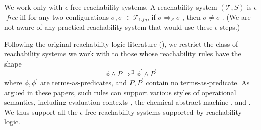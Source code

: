 

\begin{remark}\label{rem:noEmptySteps}
  We work only with $\epsilon$-free reachability systems.
  A reachability system $(\mathcal{T}, S)$ is \emph{$\epsilon$-free}
  iff for any two configurations $\sigma, \sigma^\prime \in \mathcal{T}_{\mathit{Cfg}}$, if
  $\sigma \Rightarrow_{\mathcal{S}} \sigma^\prime$, then $\sigma \not = \sigma^\prime$.
  (We are not aware of any practical reachability system that would use these $\epsilon$ steps.)
  \end{remark}

\begin{remark}\label{rem:shapeOfReachabilityRules}
  Following the original reachability logic literature (\cite{RosuS12oopsla,StefanescuCMMSR19}),
  we restrict the class of reachability systems we work with to those whose reachability rules
have the shape
\begin{equation*}
    \phi \land P \Rightarrow^\exists \phi^\prime \land P^\prime
\end{equation*}
where $\phi,\phi^\prime$ are terms-as-predicates, and $P,P^\prime$ contain no terms-as-predicate.
  As argued in these papers, such rules can support various styles of operational semantics,
  including evaluation contexts \cite{PLTRedex}, the chemical abstract machine \cite{CHAM}, and \K{} \cite{KVision}.
  We thus support all the $\epsilon$-free reachability systems supported by reachability logic.
\end{remark}

